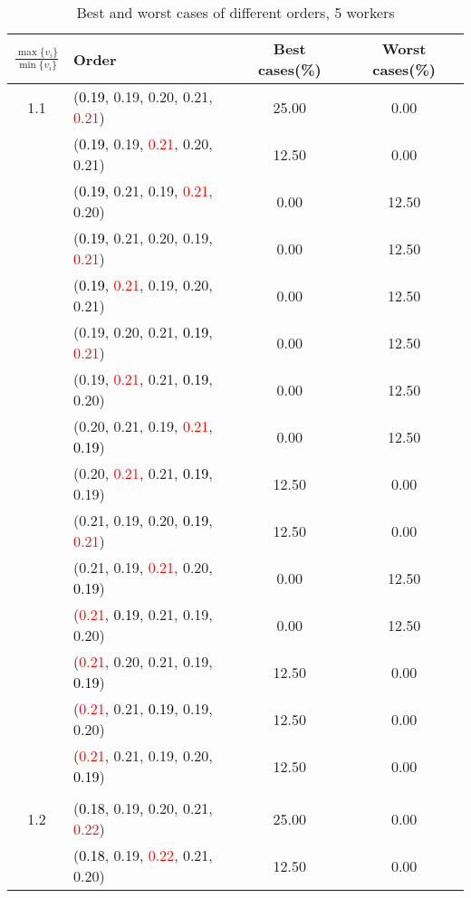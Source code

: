 \documentclass[10pt,a4paper]{report}
\begin{document}
\newpage\begin{center}
	\small
	\begin{longtable}{clcc}
		\caption{Best and worst cases of different orders, 5 workers}\\
		\toprule
		\setlength{\tabcolsep}{1mm}
		\renewcommand\baselinestretch{0.5}\selectfont
		$\frac{\max\{v_i\}}{\min\{v_i\}}$ & Order & Best cases(\%) & Worst cases(\%) \\
			\midrule		1.1			&(\textcolor{black}{0.19}, 0.19, 0.20, 0.21, \textcolor{red}{0.21})&25.00&0.00\\
			&(\textcolor{black}{0.19}, 0.19, \textcolor{red}{0.21}, 0.20, 0.21)&12.50&0.00\\
			&(\textcolor{black}{0.19}, 0.21, 0.19, \textcolor{red}{0.21}, 0.20)&0.00&12.50\\
			&(\textcolor{black}{0.19}, 0.21, 0.20, 0.19, \textcolor{red}{0.21})&0.00&12.50\\
			&(\textcolor{black}{0.19}, \textcolor{red}{0.21}, 0.19, 0.20, 0.21)&0.00&12.50\\
			&(0.19, 0.20, 0.21, \textcolor{black}{0.19}, \textcolor{red}{0.21})&0.00&12.50\\
			&(0.19, \textcolor{red}{0.21}, 0.21, \textcolor{black}{0.19}, 0.20)&0.00&12.50\\
			&(0.20, 0.21, 0.19, \textcolor{red}{0.21}, \textcolor{black}{0.19})&0.00&12.50\\
			&(0.20, \textcolor{red}{0.21}, 0.21, \textcolor{black}{0.19}, 0.19)&12.50&0.00\\
			&(0.21, 0.19, 0.20, \textcolor{black}{0.19}, \textcolor{red}{0.21})&12.50&0.00\\
			&(0.21, 0.19, \textcolor{red}{0.21}, 0.20, \textcolor{black}{0.19})&0.00&12.50\\
			&(\textcolor{red}{0.21}, \textcolor{black}{0.19}, 0.21, 0.19, 0.20)&0.00&12.50\\
			&(\textcolor{red}{0.21}, 0.20, 0.21, 0.19, \textcolor{black}{0.19})&12.50&0.00\\
			&(\textcolor{red}{0.21}, 0.21, \textcolor{black}{0.19}, 0.19, 0.20)&12.50&0.00\\
			&(\textcolor{red}{0.21}, 0.21, 0.19, 0.20, \textcolor{black}{0.19})&12.50&0.00\\
		&&&\\
		1.2			&(\textcolor{black}{0.18}, 0.19, 0.20, 0.21, \textcolor{red}{0.22})&25.00&0.00\\
			&(\textcolor{black}{0.18}, 0.19, \textcolor{red}{0.22}, 0.21, 0.20)&12.50&0.00\\

\end{longtable}
\end{center}
\end{document}
